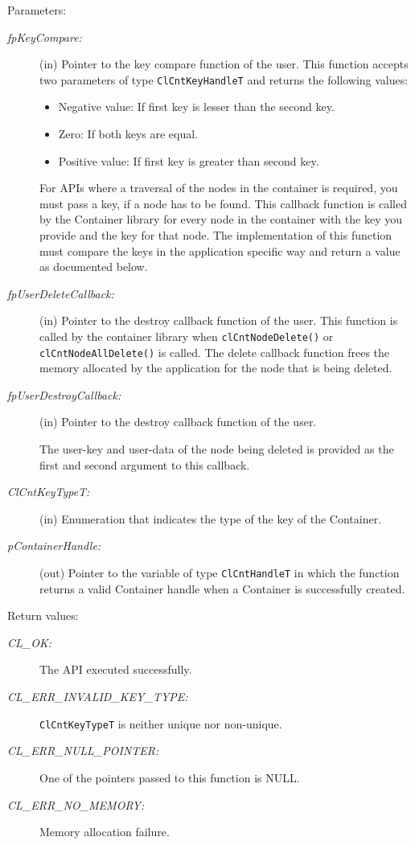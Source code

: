 \begin{Desc}
\item[Parameters:]
\begin{description}
\item[{\em fp\-Key\-Compare:}](in) Pointer to the key compare function of the user. This function accepts two parameters of type {\tt{ClCntKeyHandleT}}
and returns the following values:
\begin{itemize}
\item
Negative value: If first key is lesser than the second key.
\item
Zero: If both keys are equal.
\item
Positive value: If first key is greater than second key. 
\end{itemize}
For APIs where a traversal of the nodes in the container is required, you must pass a key, if a node has to be found. This callback function is called 
by the Container library for every node in the container with the key you provide and the key for that node. The implementation of this function must 
compare the keys in the application specific way and return a value as documented below.

\item[{\em fp\-User\-Delete\-Callback:}](in) Pointer to the destroy callback function of the user. This function is called by the container library 
when {\tt{clCntNodeDelete()}} or {\tt{clCntNodeAllDelete()}} is called. The delete callback function frees the memory allocated by the application
for the node that is being deleted.

\item[{\em fp\-User\-Destroy\-Callback:}](in) Pointer to the destroy callback function of the user. 

The user-key and user-data of the node being deleted is provided as the first and second argument to this callback.


\item[{\em Cl\-Cnt\-Key\-Type\-T:}](in) Enumeration that indicates the type of the key of the Container.

\item[{\em p\-Container\-Handle:}](out) Pointer to the variable of type {\tt{ClCntHandleT}} in which the function returns a valid Container handle when
a Container is successfully created.


\end{description}
\end{Desc}
\begin{Desc}
\item[Return values:]
\begin{description}
\item[{\em CL\_\-OK:}]The API executed successfully. 
\item[{\em CL\_\-ERR\_\-INVALID\_\-KEY\_\-TYPE:}] {\tt{ClCntKeyTypeT}} is neither unique nor non-unique.
\item[{\em CL\_\-ERR\_\-NULL\_\-POINTER:}] One of the pointers passed to this function is NULL.
\item[{\em CL\_\-ERR\_\-NO\_\-MEMORY:}] Memory allocation failure.\end{description}
\end{Desc}
